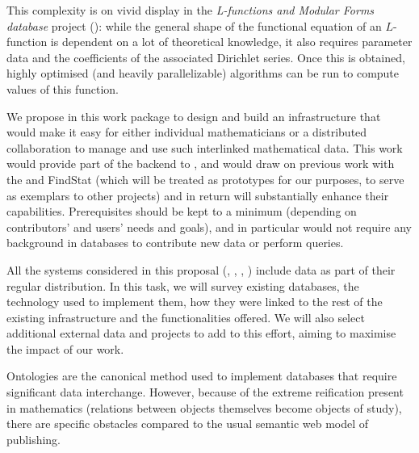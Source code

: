 \begin{workpackage}[id=dksbases,wphases=1-48!.5,
  title=Data/Knowledge/Software-Bases,lead=JU,
  ZHRM=12,JURM=36,USHRM=12,UWRM=25,SARM=10,LLRM=2,PSRM=4]
\begin{wpdescription}
  This complexity is on vivid display in the \emph{L-functions and Modular Forms database}
  project (\LMFDB): while the general shape of the functional equation of an $L$-function
  is dependent on a lot of theoretical knowledge, it also requires parameter data and the
  coefficients of the associated Dirichlet series. Once this is obtained, highly optimised
  (and heavily parallelizable) algorithms can be run to compute values of this function.

  We propose in this work package to design and build an infrastructure that would make it
  easy for either individual mathematicians or a distributed collaboration to manage and
  use such interlinked mathematical data. This work would provide part of the backend to
  , and would draw on previous work
  with the \LMFDB and FindStat (which will be treated as prototypes for our purposes, to
  serve as exemplars to other projects) and in return will substantially enhance their
  capabilities. Prerequisites should be kept to a minimum (depending on contributors' and
  users' needs and goals), and in particular would not require any background in databases
  to contribute new data or perform queries.
\end{wpdescription}

\begin{tasklist}
\begin{task}[title=Survey of existing databases,id=data-assessment,
  lead=ZH,partners={JU,SA,UW,US}]
  All the systems considered in this proposal (\GAP, \Sage, \Pari, \Singular) include data
  as part of their regular distribution. In this task, we will survey existing databases,
  the technology used to implement them, how they were linked to the rest of the existing
  infrastructure and the functionalities offered. We will also select additional external
  data and projects to add to this effort, aiming to maximise the impact of our work.
\end{task}

\begin{task}[id=data-design,lead=JU,partners={ZH,US,SA,UW,LL},
  title={Formulation of requirements and design of new  infrastructure when appropriate}]

  Ontologies are the canonical method used to implement databases that require significant
  data interchange. However, because of the extreme reification present in mathematics
  (relations between objects themselves become objects of study), there are specific
  obstacles compared to the usual semantic web model of publishing.


\end{task}
\end{tasklist}
\end{workpackage}
